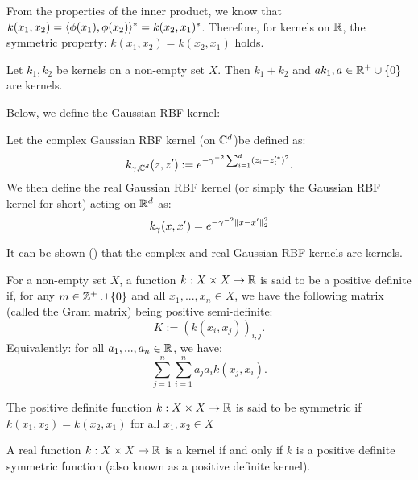 \documentclass[twoside]{memoir}
\begin{document}
	From the properties of the inner product, we know that $k(x_1, x_2) = \langle\phi(x_1), \phi(x_2)\rangle^* = k(x_2, x_1)^*$. Therefore, for kernels on $\mathbb{R}$, the symmetric property: $k(x_1, x_2) = k(x_2, x_1)$ holds.
	\begin{lem}
		Let $k_1, k_2$ be kernels on a non-empty set $X$. Then $k_1 + k_2$ and $ak_1, a \in \mathbb{R}^+ \cup \{0\}$ are kernels. 
	\end{lem}
	Below, we define the Gaussian RBF kernel:
	\begin{defn}
		Let the complex Gaussian RBF kernel (on $\mathbb{C}^d$)be defined as:
		\[ k_{\gamma, \mathbb{C}^d}(z, z') := e^{-\gamma^{-2} \sum_{i=1}^{d} (z_i - z_i'^*)^2 } .\]
		We then define the real Gaussian RBF kernel (or simply the Gaussian RBF kernel for short) acting on $\mathbb{R}^d$ as:
		\[ k_\gamma(x, x') = e^{- \gamma^{-2} \lVert x - x'\rVert_2^2} \]
	\end{defn}
	It can be shown (\cite{steinwartSVM}) that the complex and real Gaussian RBF kernels are kernels.
	\begin{defn}
		For a non-empty set $X$, a function $k: X \times X \rightarrow \mathbb{R}$ is said to be a positive definite if, for any $m \in \mathbb{Z}^+ \cup \{0\}$ and all $x_1, ..., x_n \in X$, we have the following matrix (called the Gram matrix) being positive semi-definite:
		\[ K := (k(x_i, x_j))_{i,j}. \]
		Equivalently: for all $a_1, ..., a_n \in \mathbb{R}$, we have:
		\[ \sum_{j=1}^{n} \sum_{i=1}^{n} a_j a_i k(x_j, x_i). \]
	\end{defn}
	\begin{defn}
		The positive definite function $k: X \times X \rightarrow \mathbb{R}$ is said to be symmetric if  $k(x_1, x_2) = k(x_2, x_1)$ for all $x_1, x_2 \in X$
	\end{defn}
	\begin{thm}
		A real function $k:X \times X \rightarrow \mathbb{R}$ is a kernel if and only if $k$ is a positive definite symmetric function (also known as a positive definite kernel).
	\end{thm}
\end{document}
